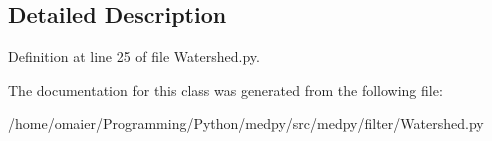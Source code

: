 \subsection{Detailed Description}


Definition at line 25 of file Watershed.py.



The documentation for this class was generated from the following file:\begin{DoxyCompactItemize}
\item 
/home/omaier/Programming/Python/medpy/src/medpy/filter/Watershed.py\end{DoxyCompactItemize}
